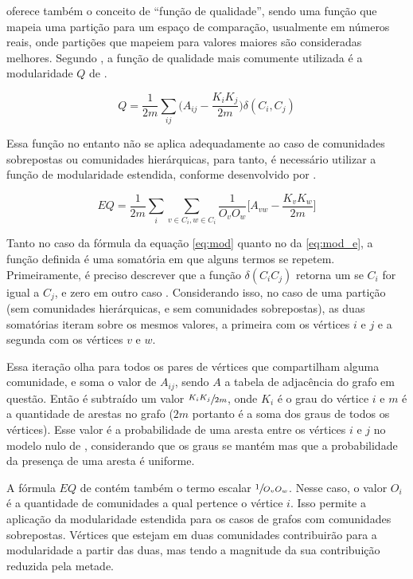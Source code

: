 \documentclass[notes.tex]{subfiles}
\begin{document}
 oferece também o conceito de ``função de qualidade'', sendo uma função que mapeia uma partição para um espaço de comparação, usualmente em números reais, onde partições que mapeiem para valores maiores são consideradas melhores.
Segundo , a função de qualidade mais comumente utilizada é a modularidade $Q$ de .

\begin{equation}\label{eq:mod}
    Q = \frac{1}{2m}\sum_{ij}\Bigg(A_{ij}-\frac{K_iK_j}{2m}\Bigg)\delta(C_i, C_j)
\end{equation}

Essa função no entanto não se aplica adequadamente ao caso de comunidades sobrepostas ou comunidades hierárquicas, para tanto, é necessário utilizar a função de modularidade estendida, conforme desenvolvido por .

\begin{equation}\label{eq:mod_e}
    EQ = \frac{1}{2m}\sum_{i}\sum_{v \in C_i, w \in C_i}\frac{1}{O_vO_w}\Bigg[A_{vw} - \frac{K_vK_w}{2m} \Bigg]
\end{equation}

Tanto no caso da fórmula da equação \ref{eq:mod} quanto no da \ref{eq:mod_e}, a função definida é uma somatória em que alguns termos se repetem.
Primeiramente, é preciso descrever que a função $\delta(C_iC_j)$ retorna um se $C_i$ for igual a  $C_j$, e zero em outro caso \cite{fortunato2010community}.
Considerando isso, no caso de uma partição (sem comunidades hierárquicas, e sem comunidades sobrepostas), as duas somatórias iteram sobre os mesmos valores, a primeira com os vértices $i$ e $j$ e a segunda com os vértices $v$ e  $w$.

Essa iteração olha para todos os pares de vértices que compartilham alguma comunidade, e soma o valor de $A_{ij}$, sendo $A$ a tabela de adjacência do grafo em questão.
Então é subtraído um valor $\sfrac{K_iK_j}{2m}$, onde  $K_i$ é o grau do vértice $i$ e  $m$ é a quantidade de arestas no grafo ($2m$ portanto é a soma dos graus de todos os vértices).
Esse valor é a probabilidade de uma aresta entre os vértices  $i$ e  $j$ no modelo nulo de , considerando que os graus se mantém mas que a probabilidade da presença de uma aresta é uniforme.

A fórmula $EQ$ de  contém também o termo escalar $\sfrac{1}{O_vO_w}$.
Nesse caso, o valor $O_i$ é a quantidade de comunidades a qual pertence o vértice $i$.
Isso permite a aplicação da modularidade estendida para os casos de grafos com comunidades sobrepostas.
Vértices que estejam em duas comunidades contribuirão para a modularidade a partir das duas, mas tendo a magnitude da sua contribuição reduzida pela metade.
\end{document}
